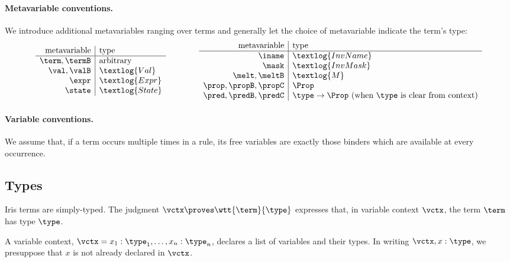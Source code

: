 \paragraph{Metavariable conventions.}
We introduce additional metavariables ranging over terms and generally let the choice of metavariable indicate the term's type:
\[
\begin{array}{r|l}
 \text{metavariable} & \text{type} \\\hline
  \term, \termB & \text{arbitrary} \\
  \val, \valB & \textlog{Val} \\
  \expr & \textlog{Expr} \\
  \state & \textlog{State} \\
\end{array}
\qquad\qquad
\begin{array}{r|l}
 \text{metavariable} & \text{type} \\\hline
  \iname & \textlog{InvName} \\
  \mask & \textlog{InvMask} \\
  \melt, \meltB & \textlog{M} \\
  \prop, \propB, \propC & \Prop \\
  \pred, \predB, \predC & \type\to\Prop \text{ (when $\type$ is clear from context)} \\
\end{array}
\]

\paragraph{Variable conventions.}
We assume that, if a term occurs multiple times in a rule, its free variables are exactly those binders which are available at every occurrence.


\subsection{Types}\label{sec:types}

Iris terms are simply-typed.
The judgment $\vctx \proves \wtt{\term}{\type}$ expresses that, in variable context $\vctx$, the term $\term$ has type $\type$.

A variable context, $\vctx = x_1:\type_1, \dots, x_n:\type_n$, declares a list of variables and their types.
In writing $\vctx, x:\type$, we presuppose that $x$ is not already declared in $\vctx$.

